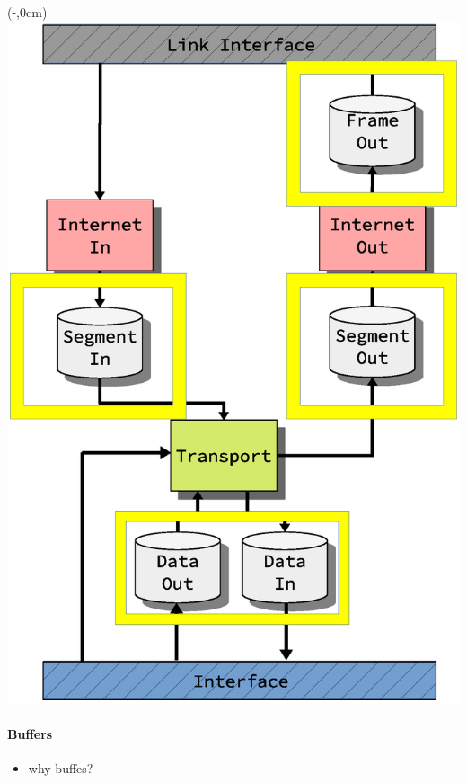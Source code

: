 \begin{frame}[fragile]
    \begin{textblock*}{\displayThumbnail}(\paperwidth-\displayThumbnail-0.2cm,0cm) %
        \colorbox{white}{\includegraphics[width=\textwidth]{implementation/design_2_memory.eps}}
    \end{textblock*}
    \frametitle{\ImplementationTitle}
    \framesubtitle{Buffers}
    \begin{itemize}
        \item why buffes?
    \end{itemize}
\end{frame}


